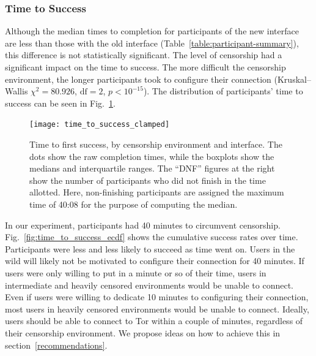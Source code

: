 \documentclass[USenglish,oneside,twocolumn]{article}
\begin{document}
\subsubsection{Time to Success} 
Although the median times to completion for participants of the new interface are less than those with the old interface (Table~\ref{table:participant-summary}), this difference is not statistically significant. The level of censorship had a significant impact on the time to success. The more difficult the censorship environment, the longer participants took to configure their connection (Kruskal--Wallis $\chi^2 = 80.926$, $\mbox{df} = 2$, $p < 10^{-15}$). The distribution of participants' time to success can be seen in Fig.~\ref{fig:time_to_success_clamped}.

\begin{figure}
\centering
\texttt{[image: time\_to\_success\_clamped]}
\caption{
Time to first success, by censorship environment and interface.
The dots show the raw completion times,
while the boxplots show the medians and interquartile ranges.
The ``DNF'' figures at the right show the number of participants 
who did not finish in the time allotted.
Here, non-finishing participants are assigned the maximum time of 40:08
for the purpose of computing the median.
}
\label{fig:time_to_success_clamped}
\end{figure}

In our experiment, participants had 40 minutes to circumvent censorship. Fig.~\ref{fig:time_to_success_ecdf} shows the cumulative success rates over time. Participants were less and less likely to succeed as time went on. Users in the wild will likely not be motivated to configure their connection for 40 minutes. If users were only willing to put in a minute or so of their time, users in intermediate and heavily censored environments would be unable to connect. Even if users were willing to dedicate 10 minutes to configuring their connection, most users in heavily censored environments would be unable to connect. Ideally, users should be able to connect to Tor within a couple of minutes, regardless of their censorship environment. We propose ideas on how to achieve this in section~\ref{recommendations}. 
\end{document}
